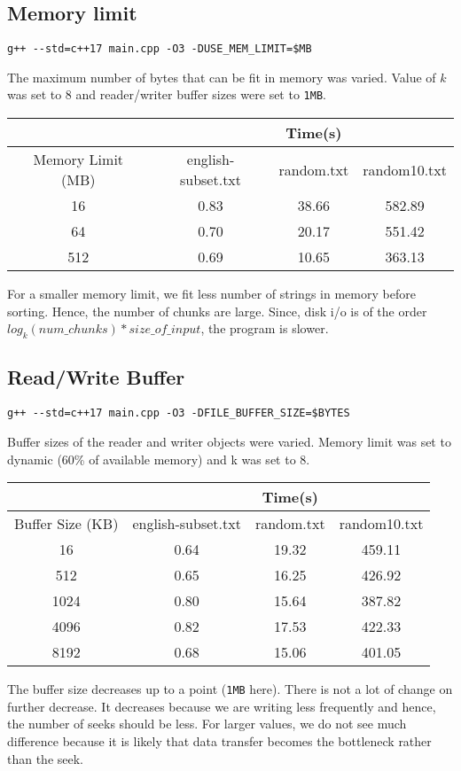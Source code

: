 \documentclass{article}
\begin{document}
\subsection{Memory limit}
\begin{lstlisting}[style = cpp]
g++ --std=c++17 main.cpp -O3 -DUSE_MEM_LIMIT=$MB
\end{lstlisting}
The maximum number of bytes that can be fit in memory was varied. Value of $k$ was set to $8$ and reader/writer buffer sizes were set to \verb|1MB|.
\begin{center}
\begin{tabular}{||c| c c c||} 
 \hline
&&Time(s)&\\
 \hline
 Memory Limit (MB) & english-subset.txt & random.txt & random10.txt \\ [0.5ex] 
 \hline\hline
 16 & 0.83 & 38.66 & 582.89 \\ 
 \hline
 64 & 0.70 & 20.17 & 551.42 \\
 \hline
 512 & 0.69 & 10.65 & 363.13\\ %
 \hline
\end{tabular}
\end{center}
For a smaller memory limit, we fit less number of strings in memory before sorting. Hence, the number of chunks are large. Since, disk i/o is of the order $log_k(num\_chunks)*size\_of\_input$, the program is slower.
\subsection{Read/Write Buffer}
\begin{lstlisting}[style = cpp]
g++ --std=c++17 main.cpp -O3 -DFILE_BUFFER_SIZE=$BYTES
\end{lstlisting}
Buffer sizes of the reader and writer objects were varied. Memory limit was set to dynamic (60\% of available memory) and k was set to $8$.
\begin{center}
\begin{tabular}{||c| c c c||} 
 \hline
&&Time(s)&\\
 \hline
 Buffer Size (KB) & english-subset.txt & random.txt & random10.txt \\ [0.5ex] 
 \hline\hline
 16 & 0.64 & 19.32 & 459.11 \\ 
 \hline
 512 & 0.65 & 16.25 & 426.92 \\
 \hline
 1024 & 0.80 & 15.64 & 387.82\\ %
 \hline
 4096 & 0.82 & 17.53 & 422.33\\ %
 \hline
 8192 & 0.68 & 15.06 & 401.05\\ %
 \hline
\end{tabular}
\end{center}
The buffer size decreases up to a point (\verb|1MB| here). There is not a lot of change on further decrease. It decreases because we are writing less frequently and hence, the number of seeks should be less. For larger values, we do not see much difference because it is likely that data transfer becomes the bottleneck rather than the seek.
\end{document}
